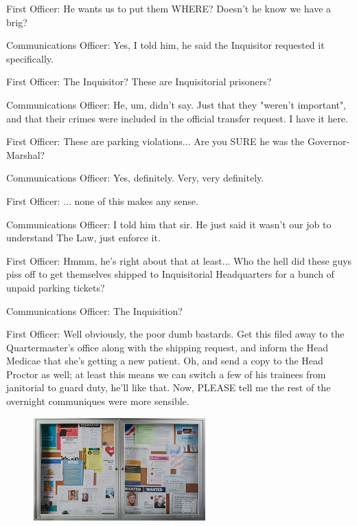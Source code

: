 





First Officer: 
He wants us to put them WHERE? 
Doesn't he know we have a brig?

Communications Officer: 
Yes, I told him, he said the Inquisitor requested it specifically.

First Officer: 
The Inquisitor? 
These are Inquisitorial prisoners?

Communications Officer: 
He, um, didn't say. 
Just that they "weren't important", and that their crimes were included in the official transfer request. 
I have it here.

First Officer: 
These are parking violations... 
Are you SURE he was the Governor-Marshal? 


Communications Officer: 
Yes, definitely. 
Very, very definitely.

First Officer: 
... 
none of this makes any sense.

Communications Officer: 
I told him that sir. 
He just said it wasn't our job to understand The Law, just enforce it.

First Officer: 
Hmmm, he's right about that at least... 
Who the hell did these guys piss off to get themselves shipped to Inquisitorial Headquarters for a bunch of unpaid parking tickets?

Communications Officer: 
The Inquisition?

First Officer: 
Well obviously, the poor dumb bastards. 
Get this filed away to the Quartermaster's office along with the shipping request, and inform the Head Medicae that she's getting a new patient. 
Oh, and send a copy to the Head Proctor as well; 
at least this means we can switch a few of his trainees from janitorial to guard duty, he'll like that. 
Now, PLEASE tell me the rest of the overnight communiques were more sensible.

\begin{figure}
	\begin{center}
		\includegraphics[width=\figwidth]{pics/20/6.png}
	\end{center}
\end{figure}

